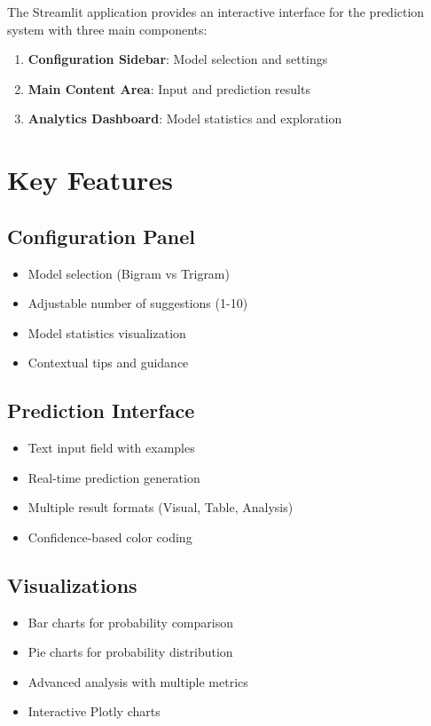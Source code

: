 \documentclass[12pt,a4paper]{report}
\begin{document}
The Streamlit application provides an interactive interface for the prediction system with three main components:

\begin{enumerate}
    \item \textbf{Configuration Sidebar}: Model selection and settings
    \item \textbf{Main Content Area}: Input and prediction results
    \item \textbf{Analytics Dashboard}: Model statistics and exploration
\end{enumerate}

\section{Key Features}

\subsection{Configuration Panel}
\begin{itemize}
    \item Model selection (Bigram vs Trigram)
    \item Adjustable number of suggestions (1-10)
    \item Model statistics visualization
    \item Contextual tips and guidance
\end{itemize}

\subsection{Prediction Interface}
\begin{itemize}
    \item Text input field with examples
    \item Real-time prediction generation
    \item Multiple result formats (Visual, Table, Analysis)
    \item Confidence-based color coding
\end{itemize}

\subsection{Visualizations}
\begin{itemize}
    \item Bar charts for probability comparison
    \item Pie charts for probability distribution
    \item Advanced analysis with multiple metrics
    \item Interactive Plotly charts
\end{itemize}
\end{document}
